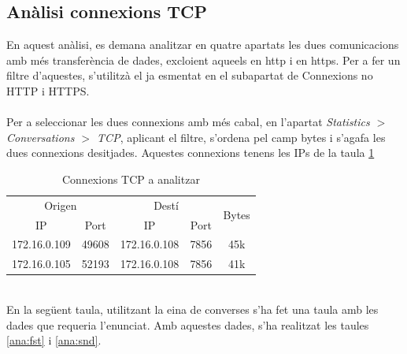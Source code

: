 \documentclass{article}
\begin{document}
\subsection{Anàlisi connexions TCP}
En aquest anàlisi, es demana analitzar en quatre apartats les dues comunicacions
amb més transferència de dades, excloient aqueels en http i en https. Per a 
fer un filtre d'aquestes, s'utilitzà el ja esmentat en el subapartat de Connexions
no HTTP i HTTPS.\\
\\
Per a seleccionar les dues connexions amb més cabal, en l'apartat
\textit{Statistics $>$ Conversations $>$ TCP}, aplicant el filtre,
s'ordena pel camp bytes i s'agafa les dues connexions desitjades.
Aquestes connexions tenens les IPs de la taula \ref{ana:conn}\\
\begin{table}[!h]
\centering
\begin{tabular}{|c|c|c|c|c|}
\hline
\multicolumn{2}{|c|}{Origen} & \multicolumn{2}{c|}{Destí} 
&\multirow{2}{*}{Bytes}
\\
\cline{1-4}
IP &Port &IP &Port &\\
\hline
172.16.0.109 &49608 &172.16.0.108 &7856 &45k
\\
\hline
172.16.0.105 &52193 &172.16.0.108 &7856 &41k
\\
\hline
\end{tabular}
\caption{Connexions TCP a analitzar}
\label{ana:conn}
\end{table}\\
En la següent taula, utilitzant la eina de converses s'ha fet una taula amb
les dades que requeria l'enunciat. Amb aquestes dades, s'ha realitzat les taules
\ref{ana:fst} i \ref{ana:snd}.\\\\
\end{document}
